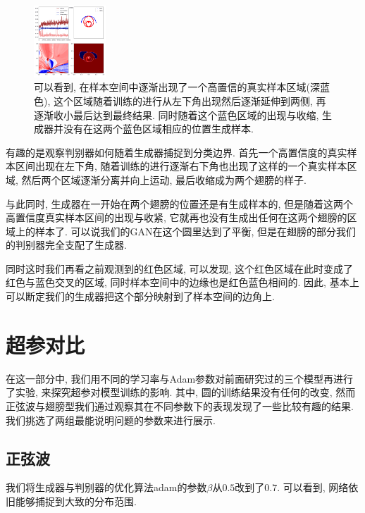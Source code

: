 \documentclass[lang=cn,11pt]{elegantpaper}
\begin{document}
\begin{figure}[hbp]
  \includegraphics[width=0.24\textwidth]{wings_3_8}
  \caption{\scriptsize 可以看到, 在样本空间中逐渐出现了一个高置信的真实样本区域(深蓝色), 这个区域随着训练的进行从左下角出现然后逐渐延伸到两侧, 再逐渐收小最后达到最终结果. 同时随着这个蓝色区域的出现与收缩, 生成器并没有在这两个蓝色区域相应的位置生成样本.}
\end{figure}

有趣的是观察判别器如何随着生成器捕捉到分类边界. 首先一个高置信度的真实样本区间出现在左下角, 随着训练的进行逐渐右下角也出现了这样的一个真实样本区域, 然后两个区域逐渐分离并向上运动, 最后收缩成为两个翅膀的样子. 

与此同时, 生成器在一开始在两个翅膀的位置还是有生成样本的, 但是随着这两个高置信度真实样本区间的出现与收紧, 它就再也没有生成出任何在这两个翅膀的区域上的样本了. 可以说我们的GAN在这个圆里达到了平衡, 但是在翅膀的部分我们的判别器完全支配了生成器. 

同时这时我们再看之前观测到的红色区域, 可以发现, 这个红色区域在此时变成了红色与蓝色交叉的区域, 同时样本空间中的边缘也是红色蓝色相间的. 因此, 基本上可以断定我们的生成器把这个部分映射到了样本空间的边角上.

\section{超参对比}

在这一部分中, 我们用不同的学习率与Adam参数对前面研究过的三个模型再进行了实验, 来探究超参对模型训练的影响. 其中, 圆的训练结果没有任何的改变, 然而正弦波与翅膀型我们通过观察其在不同参数下的表现发现了一些比较有趣的结果. 我们挑选了两组最能说明问题的参数来进行展示.

\subsection{正弦波}

我们将生成器与判别器的优化算法adam的参数$\beta$从$0.5$改到了$0.7$. 可以看到, 网络依旧能够捕捉到大致的分布范围.
\end{document}
